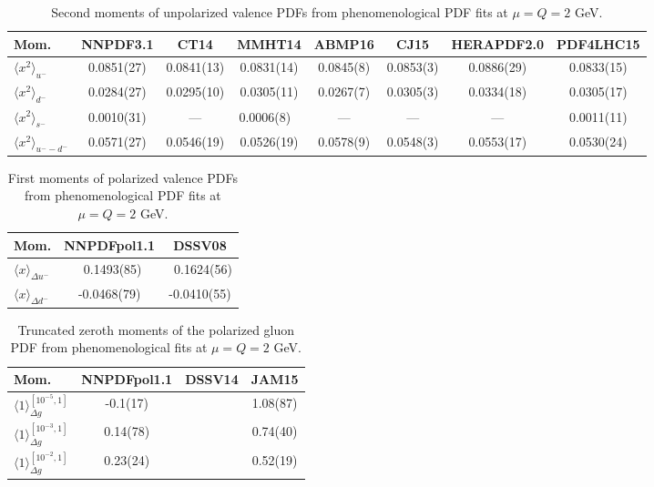 \begin{table}[!t]
\centering
\small
\begin{tabular}{lccccccc}
\toprule
Mom. & NNPDF3.1 & CT14 & MMHT14 & ABMP16 & CJ15 & HERAPDF2.0 & PDF4LHC15 \\
\midrule
$\langle x^2\rangle_{u^-}$ 
& 0.0851(27) & 0.0841(13) & 0.0831(14)    
& 0.0845(8) & 0.0853(3) & 0.0886(29) & 0.0833(15) \\
$\langle x^2\rangle_{d^-}$
& 0.0284(27) & 0.0295(10) & 0.0305(11)    
& 0.0267(7) & 0.0305(3) & 0.0334(18) & 0.0305(17) \\ 
$\langle x^2\rangle_{s^-}$
& 0.0010(31) & ---        & 0.0006(8)\ \, 
& ---       & ---       & ---        & 0.0011(11) \\
$\langle x^2\rangle_{u^--d^-}$
& 0.0571(27) & 0.0546(19) & 0.0526(19)    
& 0.0578(9) & 0.0548(3) & 0.0553(17) & 0.0530(24) \\
\bottomrule
\end{tabular}
\caption{\small Second moments of unpolarized valence PDFs from 
phenomenological PDF fits at $\mu=Q=2$ GeV.}
\label{tab:unpHmoms}
\end{table}

\begin{table}[!t]
\centering
\footnotesize
\begin{tabular}{lcc}
\toprule
Mom. & NNPDFpol1.1 & DSSV08 \\
\midrule
$\langle x\rangle_{\Delta u^-}$ 
& \ 0.1493(85) & \ 0.1624(56) \\
$\langle x\rangle_{\Delta d^-}$ 
&  -0.0468(79) &  -0.0410(55) \\
\bottomrule
\end{tabular}
\caption{\small First moments of polarized valence PDFs from phenomenological 
PDF fits at $\mu=Q=2$ GeV.}
\label{tab:polHmoms}
\end{table}

\begin{table}[!t]
\centering
\footnotesize
\begin{tabular}{lccc}
\toprule
Mom. & NNPDFpol1.1 & DSSV14 & JAM15\\
\midrule
$\langle 1\rangle_{\Delta g}^{[10^{-5},1]}$  
& -0.1(17) & & 1.08(87) \\
$\langle 1\rangle_{\Delta g}^{[10^{-3},1]}$  
& 0.14(78) & & 0.74(40) \\
$\langle 1\rangle_{\Delta g}^{[10^{-2},1]}$  
& 0.23(24) & & 0.52(19) \\
\bottomrule
\end{tabular}
\caption{\small Truncated zeroth moments of the polarized gluon PDF from 
phenomenological fits at $\mu=Q=2$ GeV.}
\label{tab:polgmom}
\end{table}
